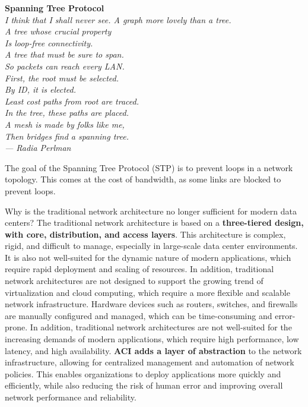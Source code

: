 \begin{note}
    \begin{center}
        \textbf{Spanning Tree Protocol}
        \textit{
            \\I think that I shall never see. A graph more lovely than a tree.\\
        A tree whose crucial property\\
        Is loop-free connectivity.\\
        A tree that must be sure to span.\\
        So packets can reach every LAN.\\
        First, the root must be selected.\\
        By ID, it is elected.\\
        Least cost paths from root are traced.\\
        In the tree, these paths are placed.\\
        A mesh is made by folks like me,\\
        Then bridges find a spanning tree.\\
        — Radia Perlman
        }
    \end{center}
    The goal of the Spanning Tree Protocol (STP) is to prevent loops in a network topology. This comes at the cost of bandwidth, as some links are blocked to prevent loops.
    \end{note}

Why is the traditional network architecture no longer sufficient for modern data centers? The traditional network architecture is based on a \textbf{three-tiered design, with core, distribution, and access layers}. This architecture is complex, rigid, and difficult to manage, especially in large-scale data center environments. It is also not well-suited for the dynamic nature of modern applications, which require rapid deployment and scaling of resources. In addition, traditional network architectures are not designed to support the growing trend of virtualization and cloud computing, which require a more flexible and scalable network infrastructure. Hardware devices such as routers, switches, and firewalls are manually configured and managed, which can be time-consuming and error-prone. In addition, traditional network architectures are not well-suited for the increasing demands of modern applications, which require high performance, low latency, and high availability. \textbf{ACI adds a layer of abstraction} to the network infrastructure, allowing for centralized management and automation of network policies. This enables organizations to deploy applications more quickly and efficiently, while also reducing the risk of human error and improving overall network performance and reliability.

